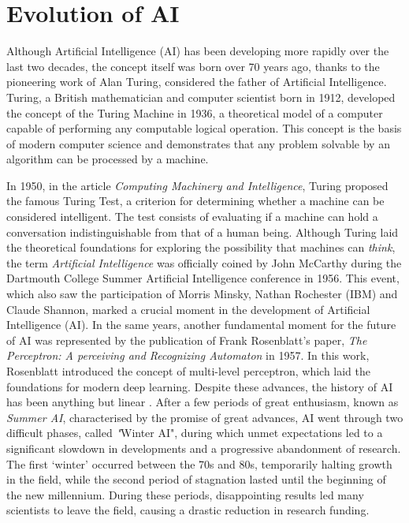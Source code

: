 \section{Evolution of AI}
Although Artificial Intelligence (AI) has been developing more rapidly over the last two decades, the concept itself was born over 70 years ago, thanks to the pioneering work of Alan Turing, considered the father of Artificial Intelligence. Turing, a British mathematician and computer scientist born in 1912, developed the concept of the Turing Machine in 1936, a theoretical model of a computer capable of performing any computable logical operation. This concept is the basis of modern computer science and demonstrates that any problem solvable by an algorithm can be processed by a machine.

In 1950, in the article \textit{Computing Machinery and Intelligence}\cite{Turing1950}, Turing proposed the famous Turing Test, a criterion for determining whether a machine can be considered intelligent. The test consists of evaluating if a machine can hold a conversation indistinguishable from that of a human being.
Although Turing laid the theoretical foundations for exploring the possibility that machines can \textit{think}, the term \textit{Artificial Intelligence} was officially coined by John McCarthy during the Dartmouth College Summer Artificial Intelligence conference in 1956. This event, which also saw the participation of Morris Minsky, Nathan Rochester (IBM) and Claude Shannon, marked a crucial moment in the development of Artificial Intelligence (AI)\cite{GRZYBOWSKI2024221}.
In the same years, another fundamental moment for the future of AI was represented by the publication of Frank Rosenblatt's paper, \textit{The Perceptron: A perceiving and Recognizing Automaton}\cite{Rosenblatt1957} in 1957.
In this work, Rosenblatt introduced the concept of multi-level perceptron, which laid the foundations for modern deep learning. Despite these advances, the history of AI has been anything but linear \cite{Toosi_2021}.
After a few periods of great enthusiasm, known as \textit{Summer AI}, characterised by the promise of great advances, AI went through two difficult phases, called \textit"{Winter AI}", during which unmet expectations led to a significant slowdown in developments and a progressive abandonment of research. The first ‘winter’ occurred between the 70s and 80s, temporarily halting growth in the field, while the second period of stagnation lasted until the beginning of the new millennium. During these periods, disappointing results led many scientists to leave the field, causing a drastic reduction in research funding.
